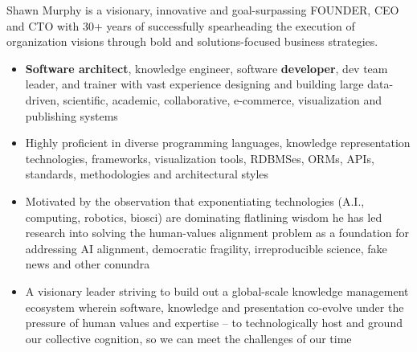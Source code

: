 \documentclass[line,margin,hidelinks]{res}
\begin{document}
\begin{resume}
\begin{par}
  Shawn Murphy is a visionary, innovative and goal-surpassing
  FOUNDER, CEO and CTO with 30+ years of successfully spearheading the
  execution of organization visions through bold and solutions-focused
  business strategies.
  \begin{itemize}
  \item \textbf{Software architect}, knowledge engineer,
    software \textbf{developer}, dev team leader,
    and trainer with vast experience designing and building large
    data-driven, scientific, academic, collaborative, e-commerce,
    visualization and publishing systems
  \item Highly proficient in diverse programming languages, knowledge
    representation technologies, frameworks, visualization tools, RDBMSes,
    ORMs, APIs, standards, methodologies and architectural styles
  \item Motivated by the observation that exponentiating technologies
    (A.I., computing, robotics, biosci) are dominating flatlining
    wisdom he has led research into solving the human-values
    alignment problem as a foundation for addressing AI alignment,
    democratic fragility, irreproducible science, fake news and other conundra
  \item A visionary leader striving to build out a global-scale
    knowledge management ecosystem wherein software, knowledge and
    presentation co-evolve under the pressure of human values and
    expertise -- to technologically host and ground our collective
    cognition, so we can meet the challenges of our time
  \end{itemize}

\end{par}



\end{resume}
\end{document}
